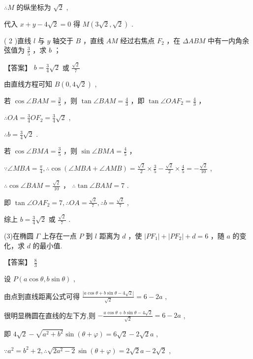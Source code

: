 \documentclass[10pt]{article}
\newcommand*\circled[1]{\tikz[baseline=(char.base)]{\node[shape=circle,draw,inner sep=1.5pt] (char) {\small #1};}}
\begin{document}
\(\therefore M\) 的纵坐标为 \(\sqrt{2}\) ,

代入 \(x + y - 4\sqrt{2} = 0\) 得 \(M\left( {3\sqrt{2},\sqrt{2}}\right)\) .

( 2 )直线 \(l\) 与 \(y\) 轴交于 \(B\) ，直线 \({AM}\) 经过右焦点 \({F}_{2}\) ，在 \({\Delta ABM}\) 中有一内角余弦值为 \(\frac{3}{5}\) ，求 \(b\) ；

【答案】 \(b = \frac{3}{4}\sqrt{2}\) 或 \(\frac{\sqrt{2}}{7}\)

由直线方程可知 \(B\left( {0,4\sqrt{2}}\right)\) ,

 \circled{1} 若 \(\cos \angle {BAM} = \frac{3}{5}\) ，则 \(\tan \angle {BAM} = \frac{4}{3}\) ，即 \(\tan \angle {OA}{F}_{2} = \frac{4}{3}\) ，

\(\therefore {OA} = \frac{3}{4}O{F}_{2} = \frac{3}{4}\sqrt{2}\) ,

\(\therefore b = \frac{3}{4}\sqrt{2}\) .

 \circled{2} 若 \(\cos \angle {BMA} = \frac{3}{5}\) ，则 \(\sin \angle {BMA} = \frac{4}{5}\) ，

\(\because \angle {MBA} = \frac{\pi }{4},\therefore \cos \left( {\angle {MBA} + \angle {AMB}}\right)  = \frac{\sqrt{2}}{2} \times  \frac{3}{5} - \frac{\sqrt{2}}{2} \times  \frac{4}{5} =  - \frac{\sqrt{2}}{10}\) ,

\(\therefore \cos \angle {BAM} = \frac{\sqrt{2}}{10}\) ， \(\therefore \tan \angle {BAM} = 7\) .

即 \(\tan \angle {OA}{F}_{2} = 7,\therefore {OA} = \frac{\sqrt{2}}{7},\therefore b = \frac{\sqrt{2}}{7}\) ,

综上 \(b = \frac{3}{4}\sqrt{2}\) 或 \(\frac{\sqrt{2}}{7}\) .

(3)在椭圆 \(\Gamma\) 上存在一点 \(P\) 到 \(l\) 距离为 \(d\) ，使 \(\left| {P{F}_{1}}\right|  + \left| {P{F}_{2}}\right|  + d = 6\) ，随 \(a\) 的变化，求 \(d\) 的最小值.

【答案】 \(\frac{8}{3}\)

设 \(P\left( {a\cos \theta ,b\sin \theta }\right)\) ,

由点到直线距离公式可得 \(\frac{\left| a\cos \theta  + b\sin \theta  - 4\sqrt{2}\right| }{\sqrt{2}} = 6 - {2a}\) ,

很明显椭圆在直线的左下方,则 \(- \frac{a\cos \theta  + b\sin \theta  - 4\sqrt{2}}{\sqrt{2}} = 6 - {2a}\) ,

即 \(4\sqrt{2} - \sqrt{{a}^{2} + {b}^{2}}\sin \left( {\theta  + \varphi }\right)  = 6\sqrt{2} - 2\sqrt{2}a\) ,

\(\because {a}^{2} = {b}^{2} + 2,\therefore \sqrt{2{a}^{2} - 2}\sin \left( {\theta  + \varphi }\right)  = 2\sqrt{2}a - 2\sqrt{2}\) ,
\end{document}
